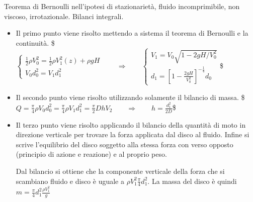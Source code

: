 \documentclass[letterpaper,10pt,italian]{jupyterBook}
\begin{document}
\sphinxAtStartPar
Teorema di Bernoulli nell’ipotesi di stazionarietà, fluido
incomprimibile, non viscoso, irrotazionale. Bilanci integrali.
\begin{itemize}
\item {} 
\sphinxAtStartPar
Il primo punto viene risolto mettendo a sistema il teorema di
Bernoulli e la continuità. \$\(\begin{cases}
  \frac{1}{2} \rho V_0^2  = \frac{1}{2}\rho V_1^2(z) + \rho g H\\
  V_0 d_0^2 = V_1 d_1^2
\end{cases} \qquad \Rightarrow \qquad 
\begin{cases}
  V_1 = V_0\sqrt{1 - 2 g H / V_0^2} \\
  d_1 = \displaystyle\left[1 - \frac{2 g H}{V_0^2}\right]^{-\frac{1}{4}} d_0
\end{cases}\)\$

\item {} 
\sphinxAtStartPar
Il secondo punto viene risolto utilizzando solamente il bilancio di
massa.
\$\(Q = \frac{\pi}{4} \rho V_0 d_0^2 = \frac{\pi}{4} \rho V_1 d_1^2 = \frac{\pi}{2} D h V_2 \qquad \Rightarrow \qquad h = \frac{d_1^2}{2 D}\)\$

\item {} 
\sphinxAtStartPar
Il terzo punto viene risolto applicando il bilancio della quantità
di moto in direzione verticale per trovare la forza applicata dal
disco al fluido. Infine si scrive l’equilibrio del disco soggetto
alla stessa forza con verso opposto (principio di azione e reazione)
e al proprio peso.

\sphinxAtStartPar
Dal bilancio si ottiene che la componente verticale della forza che
si scambiano fluido e disco è uguale a
\(\rho V_1^2 \frac{\pi}{4} d_1^2\). La massa del disco è quindi
\(m = \frac{\pi}{4} d_1^2 \frac{\rho V_1^2}{g}\)

\end{itemize}

\sphinxstepscope
\end{document}
